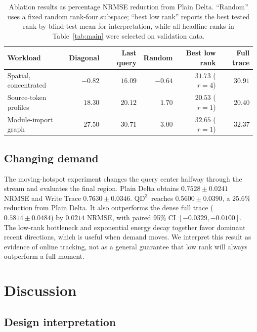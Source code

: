 \documentclass[pdflatex,sn-mathphys-num]{sn-jnl}
\theoremstyle{thmstyleone}
\newcommand{\QDDD}{\ensuremath{\mathrm{QD}^{3}}}
\begin{document}
\begin{table}[t]
\caption{Ablation results as percentage NRMSE reduction from Plain Delta. ``Random'' uses a fixed random rank-four subspace; ``best low rank'' reports the best tested rank by blind-test mean for interpretation, while all headline ranks in Table~\ref{tab:main} were selected on validation data.}
\label{tab:ablation}
\centering
\small
\begin{tabular}{lrrrrr}
\toprule
Workload & Diagonal & Last query & Random & Best low rank & Full trace \\
\midrule
Spatial, concentrated & $-0.82$ & $16.09$ & $-0.64$ & $31.73$ ($r=4$) & $30.91$ \\
Source-token profiles & $18.30$ & $20.12$ & $1.70$ & $20.53$ ($r=1$) & $20.40$ \\
Module-import graph & $27.50$ & $30.71$ & $3.00$ & $32.65$ ($r=1$) & $32.37$ \\
\bottomrule
\end{tabular}
\end{table}

\subsection{Changing demand}

The moving-hotspot experiment changes the query center halfway through the stream and evaluates the final region. Plain Delta obtains $0.7528\pm0.0241$ NRMSE and Write Trace $0.7630\pm0.0346$. \QDDD\ reaches $0.5600\pm0.0390$, a 25.6\% reduction from Plain Delta. It also outperforms the dense full trace ($0.5814\pm0.0484$) by $0.0214$ NRMSE, with paired 95\% CI $[-0.0329,-0.0100]$. The low-rank bottleneck and exponential energy decay together favor dominant recent directions, which is useful when demand moves. We interpret this result as evidence of online tracking, not as a general guarantee that low rank will always outperform a full moment.

\section{Discussion}\label{sec:discussion}

\subsection{Design interpretation}
\end{document}

